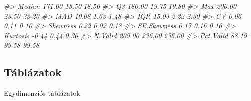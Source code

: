 \documentclass[
]{book}
\newenvironment{Shaded}{\begin{snugshade}}{\end{snugshade}}
\newcommand{\CommentTok}[1]{\textcolor[rgb]{0.56,0.35,0.01}{\textit{#1}}}
\begin{document}
\begin{Shaded}
\begin{Highlighting}[]
\CommentTok{\#\textgreater{}            Median   171.00    18.50    18.50}
\CommentTok{\#\textgreater{}                Q3   180.00    19.75    19.80}
\CommentTok{\#\textgreater{}               Max   200.00    23.50    23.20}
\CommentTok{\#\textgreater{}               MAD    10.08     1.63     1.48}
\CommentTok{\#\textgreater{}               IQR    15.00     2.22     2.30}
\CommentTok{\#\textgreater{}                CV     0.06     0.11     0.10}
\CommentTok{\#\textgreater{}          Skewness     0.22     0.02     0.18}
\CommentTok{\#\textgreater{}       SE.Skewness     0.17     0.16     0.16}
\CommentTok{\#\textgreater{}          Kurtosis    {-}0.44     0.44     0.30}
\CommentTok{\#\textgreater{}           N.Valid   209.00   236.00   236.00}
\CommentTok{\#\textgreater{}         Pct.Valid    88.19    99.58    99.58}
\end{Highlighting}
\end{Shaded}

\hypertarget{tuxe1bluxe1zatok-1}{%
\subsection{Táblázatok}\label{tuxe1bluxe1zatok-1}}

Egydimenziós táblázatok
\end{document}
